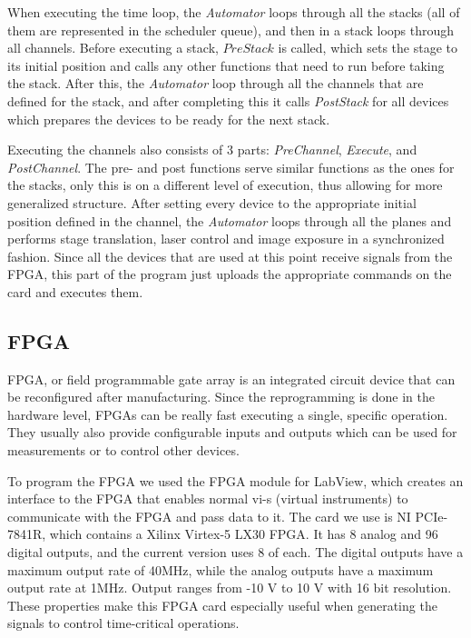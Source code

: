 \documentclass{diploma_style}
\begin{document}
When executing the time loop, the \emph{Automator} loops through all the stacks (all of them are represented in the scheduler queue), and then in a stack loops through all channels. Before executing a stack, $PreStack$ is called, which sets the stage to its initial position and calls any other functions that need to run before taking the stack. After this, the \emph{Automator} loop through all the channels that are defined for the stack, and after completing this it calls \emph{PostStack} for all devices which prepares the devices to be ready for the next stack.

Executing the channels also consists of 3 parts: \emph{PreChannel}, \emph{Execute}, and \emph{PostChannel}. The pre- and post functions serve similar functions as the ones for the stacks, only this is on a different level of execution, thus allowing for more generalized structure. After setting every device to the appropriate initial position defined in the channel, the \emph{Automator} loops through all the planes and performs stage translation, laser control and image exposure in a synchronized fashion. Since all the devices that are used at this point receive signals from the FPGA, this part of the program just uploads the appropriate commands on the card and executes them.


\subsection{FPGA}
\label{fpga}
FPGA, or field programmable gate array is an integrated circuit device that can be reconfigured after manufacturing. Since the reprogramming is done in the hardware level, FPGAs can be really fast executing a single, specific operation. They usually also provide configurable inputs and outputs which can be used for measurements or to control other devices.

To program the FPGA we used the FPGA module for LabView, which creates an interface to the FPGA that enables normal vi-s (virtual instruments) to communicate with the FPGA and pass data to it. The card we use is NI PCIe-7841R, which contains a Xilinx Virtex-5 LX30 FPGA. It has 8 analog and 96 digital outputs, and the current version uses 8 of each. The digital outputs have a maximum output rate of 40MHz, while the analog outputs have a maximum output rate at 1MHz. Output ranges from -10 V to 10 V with 16 bit resolution. These properties make this FPGA card especially useful when generating the signals to control time-critical operations.
\end{document}
